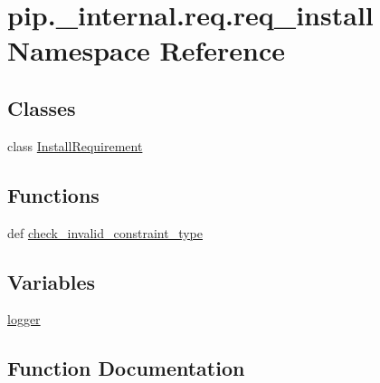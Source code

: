 \hypertarget{namespacepip_1_1__internal_1_1req_1_1req__install}{}\section{pip.\+\_\+internal.\+req.\+req\+\_\+install Namespace Reference}
\label{namespacepip_1_1__internal_1_1req_1_1req__install}
\subsection*{Classes}
\begin{DoxyCompactItemize}
\item 
class \hyperlink{classpip_1_1__internal_1_1req_1_1req__install_1_1InstallRequirement}{Install\+Requirement}
\end{DoxyCompactItemize}
\subsection*{Functions}
\begin{DoxyCompactItemize}
\item 
def \hyperlink{namespacepip_1_1__internal_1_1req_1_1req__install_a9bf881e7db603e79e90ee41fe982a439}{check\+\_\+invalid\+\_\+constraint\+\_\+type}
\end{DoxyCompactItemize}
\subsection*{Variables}
\begin{DoxyCompactItemize}
\item 
\hyperlink{namespacepip_1_1__internal_1_1req_1_1req__install_a44cc981c8dfc9857ec9863043928af38}{logger}
\end{DoxyCompactItemize}


\subsection{Function Documentation}
\mbox{\label{namespacepip_1_1__internal_1_1req_1_1req__install_a9bf881e7db603e79e90ee41fe982a439}} 
